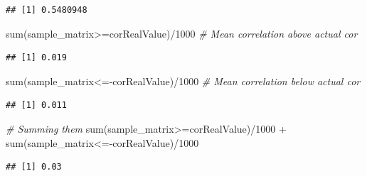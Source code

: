 \documentclass[
  notitlepage,
  onecolumn,
  openany]{book}
\newenvironment{Shaded}{\begin{snugshade}}{\end{snugshade}}
\newcommand{\CommentTok}[1]{\textcolor[rgb]{0.56,0.35,0.01}{\textit{#1}}}
\newcommand{\DecValTok}[1]{\textcolor[rgb]{0.00,0.00,0.81}{#1}}
\newcommand{\DocumentationTok}[1]{\textcolor[rgb]{0.56,0.35,0.01}{\textbf{\textit{#1}}}}
\newcommand{\FunctionTok}[1]{\textcolor[rgb]{0.00,0.00,0.00}{#1}}
\newcommand{\NormalTok}[1]{#1}
\newcommand{\OtherTok}[1]{\textcolor[rgb]{0.56,0.35,0.01}{#1}}
\newcommand{\SpecialCharTok}[1]{\textcolor[rgb]{0.00,0.00,0.00}{#1}}
\begin{document}
\begin{Shaded}
\end{Shaded}

\begin{verbatim}
## [1] 0.5480948
\end{verbatim}

\begin{Shaded}
\begin{Highlighting}[]
\FunctionTok{sum}\NormalTok{(sample\_matrix}\SpecialCharTok{\textgreater{}=}\NormalTok{corRealValue)}\SpecialCharTok{/}\DecValTok{1000} \CommentTok{\# Mean correlation above actual cor}
\end{Highlighting}
\end{Shaded}

\begin{verbatim}
## [1] 0.019
\end{verbatim}

\begin{Shaded}
\begin{Highlighting}[]
\FunctionTok{sum}\NormalTok{(sample\_matrix}\SpecialCharTok{\textless{}={-}}\NormalTok{corRealValue)}\SpecialCharTok{/}\DecValTok{1000} \CommentTok{\# Mean correlation below actual cor}
\end{Highlighting}
\end{Shaded}

\begin{verbatim}
## [1] 0.011
\end{verbatim}

\begin{Shaded}
\begin{Highlighting}[]
\CommentTok{\# Summing them}
\FunctionTok{sum}\NormalTok{(sample\_matrix}\SpecialCharTok{\textgreater{}=}\NormalTok{corRealValue)}\SpecialCharTok{/}\DecValTok{1000} \SpecialCharTok{+} \FunctionTok{sum}\NormalTok{(sample\_matrix}\SpecialCharTok{\textless{}={-}}\NormalTok{corRealValue)}\SpecialCharTok{/}\DecValTok{1000}
\end{Highlighting}
\end{Shaded}

\begin{verbatim}
## [1] 0.03
\end{verbatim}
\end{document}
